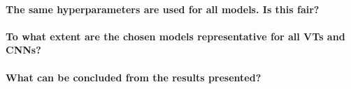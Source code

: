 \paragraph{The same hyperparameters are used for all models. Is this fair?}

\paragraph{To what extent are the chosen models representative for all VTs and CNNs?}

\paragraph{What can be concluded from the results presented?}

